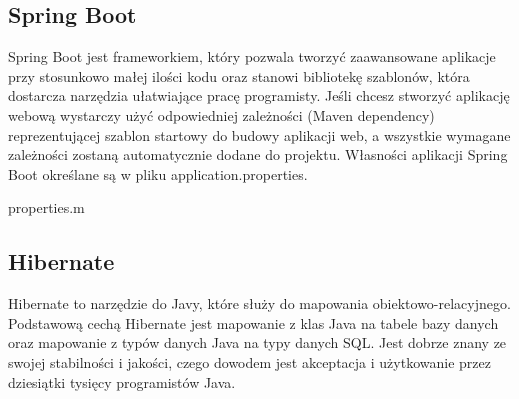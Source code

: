 \documentclass[10pt,a4paper]{report}
\begin{document}
\begin{adjustwidth}{2cm}{2cm}
\subsection{Spring Boot}
\begin{minipage}{1\linewidth}
Spring Boot jest frameworkiem, który pozwala tworzyć zaawansowane aplikacje przy stosunkowo małej ilości kodu oraz stanowi bibliotekę szablonów, która dostarcza narzędzia ułatwiające pracę programisty. Jeśli chcesz stworzyć aplikację webową wystarczy użyć odpowiedniej zależności (Maven dependency) reprezentującej szablon startowy do budowy aplikacji web, a wszystkie wymagane zależności zostaną automatycznie dodane do projektu.
Własności aplikacji Spring Boot określane są w pliku application.properties. 
\end{minipage}
\begin{center}
\begin{lstinputlisting}[ escapeinside=``,caption={\textit{Przykładowe użycie pliku application.properties w projekcie}}]
{properties.m}
\end{lstinputlisting}
\end{center}
\subsection{Hibernate}
\begin{minipage}{1\linewidth}
Hibernate to narzędzie do Javy, które służy do mapowania obiektowo-relacyjnego. Podstawową cechą Hibernate jest mapowanie z klas Java na tabele bazy danych oraz mapowanie z typów danych Java na typy danych SQL. Jest dobrze znany ze swojej stabilności i jakości, czego dowodem jest akceptacja i użytkowanie przez dziesiątki tysięcy programistów Java.
\end{minipage}

\end{adjustwidth}
\end{document}
